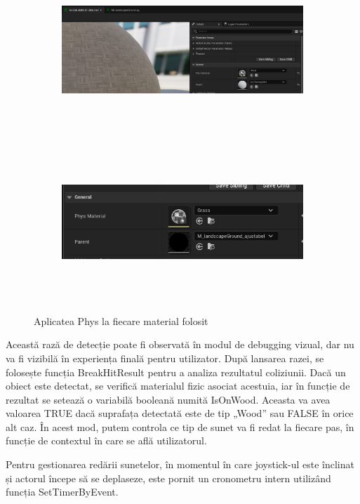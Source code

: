\begin{figure}[h!]
    \centering
    \begin{subfigure}{0.49\textwidth}
        \includegraphics[width=\linewidth, height=6cm]{continut/capitol3/figuri/phys.png}
        \label{fig:Materials}
    \end{subfigure}
    \hfill
    \begin{subfigure}{0.49\textwidth}
        \includegraphics[width=\linewidth, height=6cm]{continut/capitol3/figuri/phys_apply.png}
        \label{fig:Materials}
    \end{subfigure}
    \caption{Aplicatea Phys la fiecare material folosit}
\end{figure}

Această rază de detecție poate fi observată în modul de debugging vizual, dar nu va fi vizibilă în experiența finală pentru utilizator. După lansarea razei, se folosește funcția BreakHitResult pentru a analiza rezultatul coliziunii. Dacă un obiect este detectat, se verifică materialul fizic asociat acestuia, iar în funcție de rezultat se setează o variabilă booleană numită IsOnWood. Aceasta va avea valoarea TRUE dacă suprafața detectată este de tip „Wood” sau FALSE în orice alt caz. În acest mod, putem controla ce tip de sunet va fi redat la fiecare pas, în funcție de contextul în care se află utilizatorul.

Pentru gestionarea redării sunetelor, în momentul în care joystick-ul este înclinat și actorul începe să se deplaseze, este pornit un cronometru intern utilizând funcția SetTimerByEvent. 


